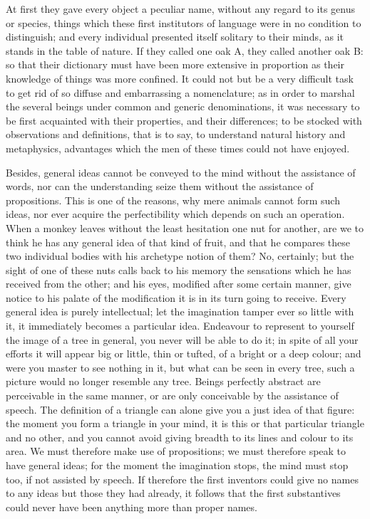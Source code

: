\documentclass[11pt,twocolumn]{ltugboat}
\begin{document}
At first they gave every object a peculiar name, without any regard to
its genus or species, things which these first institutors of language
were in no condition to distinguish; and every individual presented
itself solitary to their minds, as it stands in the table of nature.
If they called one oak A, they called another oak B: so that their
dictionary must have been more extensive in proportion as their
knowledge of things was more confined. It could not but be a very
difficult task to get rid of so diffuse and embarrassing a
nomenclature; as in order to marshal the several beings under common
and generic denominations, it was necessary to be first acquainted
with their properties, and their differences; to be stocked with
observations and definitions, that is to say, to understand natural
history and metaphysics, advantages which the men of these times could
not have enjoyed.

Besides, general ideas cannot be conveyed to the mind without the
assistance of words, nor can the understanding seize them without the
assistance of propositions. This is one of the reasons, why mere
animals cannot form such ideas, nor ever acquire the perfectibility
which depends on such an operation. When a monkey leaves without the
least hesitation one nut for another, are we to think he has any
general idea of that kind of fruit, and that he compares these two
individual bodies with his archetype notion of them? No, certainly;
but the sight of one of these nuts calls back to his memory the
sensations which he has received from the other; and his eyes,
modified after some certain manner, give notice to his palate of the
modification it is in its turn going to receive. Every general idea is
purely intellectual; let the imagination tamper ever so little with
it, it immediately becomes a particular idea. Endeavour to represent
to yourself the image of a tree in general, you never will be able to
do it; in spite of all your efforts it will appear big or little, thin
or tufted, of a bright or a deep colour; and were you master to see
nothing in it, but what can be seen in every tree, such a picture
would no longer resemble any tree. Beings perfectly abstract are
perceivable in the same manner, or are only conceivable by the
assistance of speech. The definition of a triangle can alone give you
a just idea of that figure: the moment you form a triangle in your
mind, it is this or that particular triangle and no other, and you
cannot avoid giving breadth to its lines and colour to its area. We
must therefore make use of propositions; we must therefore speak to
have general ideas; for the moment the imagination stops, the mind
must stop too, if not assisted by speech. If therefore the first
inventors could give no names to any ideas but those they had already,
it follows that the first substantives could never have been anything
more than proper names.
\end{document}
